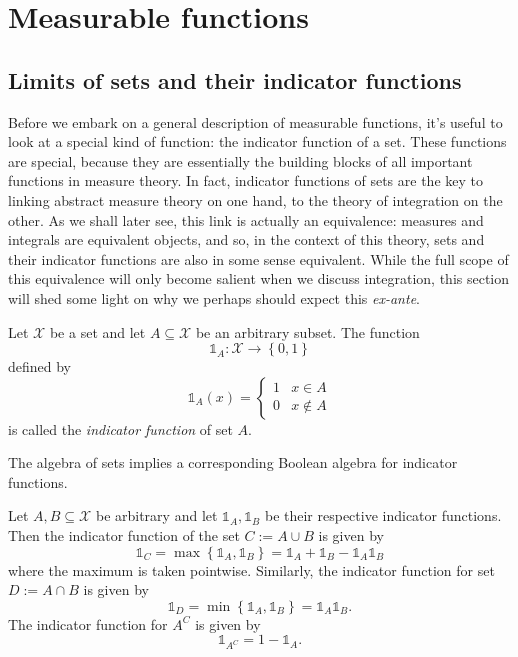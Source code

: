 
\chapter{Measurable functions}

\section{Limits of sets and their indicator functions}

Before we embark on a general description of measurable functions,
it's useful to look at a special kind of function: the indicator function
of a set. These functions are special, because they are essentially
the building blocks of all important functions in measure theory.
In fact, indicator functions of sets are the key to linking abstract
measure theory on one hand, to the theory of integration on the other.
As we shall later see, this link is actually an equivalence: measures
and integrals are equivalent objects, and so, in the context of this
theory, sets and their indicator functions are also in some sense
equivalent. While the full scope of this equivalence will only become
salient when we discuss integration, this section will shed some light
on why we perhaps should expect this \emph{ex-ante}.
\begin{defn}
\label{def:indicatorFunction}Let $\mathcal{X}$ be a set and let
$A\subseteq\mathcal{X}$ be an arbitrary subset. The function 
\[
\mathds{1}_{A}:\mathcal{X}\longrightarrow\left\{ 0,1\right\} 
\]
defined by
\[
\mathds{1}_{A}\left(x\right)=\begin{cases}
1 & x\in A\\
0 & x\notin A
\end{cases}
\]
is called the \emph{indicator function }of set $A$.
\end{defn}

The algebra of sets implies a corresponding Boolean algebra for indicator
functions.
\begin{fact}
\label{fact:indicatorFunctionsFiniteOperations}Let $A,B\subseteq\mathcal{X}$
be arbitrary and let $\mathds{1}_{A},\mathds{1}_{B}$ be their respective
indicator functions. Then the indicator function of the set $C:=A\cup B$
is given by
\[
\mathds{1}_{C}=\max\left\{ \mathds{1}_{A},\mathds{1}_{B}\right\} =\mathds{1}_{A}+\mathds{1}_{B}-\mathds{1}_{A}\mathds{1}_{B}
\]
where the maximum is taken pointwise. Similarly, the indicator function
for set $D:=A\cap B$ is given by
\[
\mathds{1}_{D}=\min\left\{ \mathds{1}_{A},\mathds{1}_{B}\right\} =\mathds{1}_{A}\mathds{1}_{B}.
\]
The indicator function for $A^{C}$ is given by
\[
\mathds{1}_{A^{C}}=1-\mathds{1}_{A}.
\]
\end{fact}

